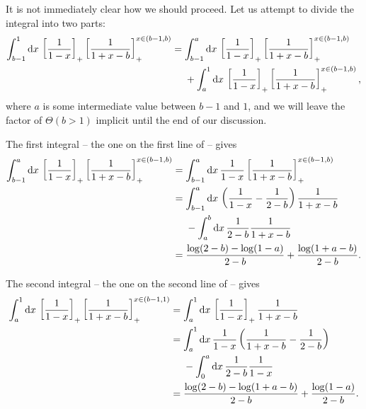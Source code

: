 It is not immediately clear how we should proceed.
%
Let us attempt to divide the integral into two parts:
\begin{align}
    \int_{b-1}^{1} \dd x\,
    \le[\frac{1}{1 - x}\ri]_+
    \le[\frac{1}{1 + x - b}\ri]_+^{x\in(b-1,b)}
    &=
    \int_{b-1}^{a} \dd x\,
    \le[\frac{1}{1 - x}\ri]_+
    \le[\frac{1}{1 + x - b}\ri]_+^{x\in(b-1,b)}
    \label{eq:double_plus}
    \\
    &~~~~+
    \int_{a}^{1} \dd x\,
    \le[\frac{1}{1 - x}\ri]_+
    \le[\frac{1}{1 + x - b}\ri]_+^{x\in(b-1,b)}
    \notag
    ,
\end{align}
where \(a\) is some intermediate value between \(b-1\) and \(1\), and we will leave the factor of \(\Theta(b > 1)\) implicit until the end of our discussion.

The first integral -- the one on the first line of  -- gives
\begin{align}
    \int_{b-1}^{a} \dd x\,
    \left[\frac{1}{1 - x}\right]_+
    \left[\frac{1}{1 + x - b}\right]_+^{x\in(b-1,b)}
    &=
    \int_{b-1}^{a} \dd x\,
    \frac{1}{1 - x}
    \left[\frac{1}{1 + x - b}\right]_+^{x\in(b-1,b)}
    \\
    &=
    \int_{b-1}^{a} \dd x\,
    \left(
        \frac{1}{1 - x} - \frac{1}{2 - b}
    \right)
    \frac{1}{1 + x - b}
    \notag
    \\
    &~~~~-
    \int_{a}^{b} \dd x\,
    \frac{1}{2 - b}
    \frac{1}{1 + x - b}
    \\
    &=
    \frac{\log(2-b) - \log(1-a)}{2 - b}
    +
    \frac{\log(1+a-b)}{2 - b}
    \notag
    .
\end{align}

The second integral -- the one on the second line of  -- gives
\begin{align}
    \int_{a}^{1} \dd x\,
    \left[\frac{1}{1 - x}\right]_+
    \left[\frac{1}{1 + x - b}\right]_+^{x\in(b-1,1)}
    &=
    \int_{a}^{1} \dd x\,
    \left[\frac{1}{1 - x}\right]_+
    \frac{1}{1 + x - b}
    \\
    &=
    \int_{a}^{1} \dd x\,
    \frac{1}{1 - x}
    \left(
        \frac{1}{1 + x - b} - \frac{1}{2 - b}
    \right)
    \notag
    \\
    &~~~~-
    \int_{0}^{a} \dd x\,
    \frac{1}{2 - b}
    \frac{1}{1 - x}
    \\
    &=
    \frac{\log(2-b) - \log(1+a-b)}{2 - b} + \frac{\log(1-a)}{2 - b}
    \notag
    .
\end{align}

